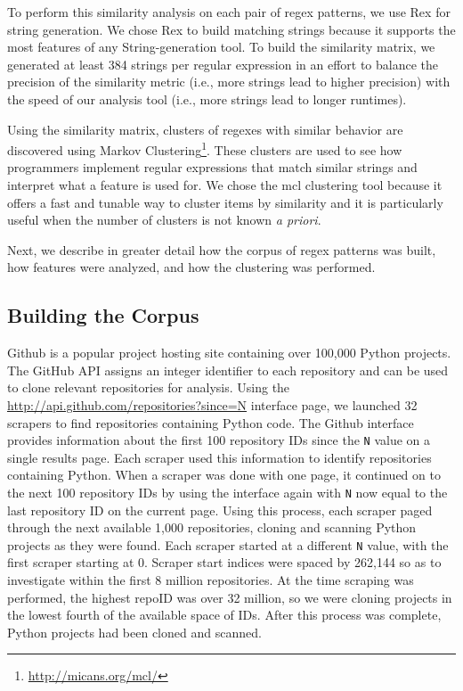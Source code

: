 To perform this similarity analysis on each pair of regex patterns, we use Rex for string generation.  We chose Rex to build matching strings because it supports the most features of any String-generation tool. To build the similarity matrix, we generated at least 384 strings per regular expression in an effort to balance the precision of the similarity metric (i.e., more strings lead to higher precision) with the speed of our analysis tool (i.e., more strings lead to longer runtimes).

Using the similarity matrix, clusters of regexes with similar behavior are discovered using Markov Clustering\footnote{\url{http://micans.org/mcl/}}.  These clusters are used to see how programmers implement regular expressions that match similar strings and interpret what a feature is used for.
 We chose the mcl clustering tool because it offers a fast and tunable way to cluster items by similarity and it is particularly useful when the number of clusters is not known \emph{a priori}.


Next, we describe in greater detail how the corpus of regex patterns was built, how features were analyzed, and how the clustering was performed.




\subsection{Building the Corpus}
\label{study:corpus}
Github is a popular project hosting site containing over 100,000 Python projects.  The GitHub API assigns an integer identifier to each repository and can be used to clone relevant repositories for analysis.  Using the \url{http://api.github.com/repositories?since=N} interface page, we launched 32 scrapers to find repositories containing Python code.  The Github interface provides information about the first 100 repository IDs since the {\tt N} value on a single results page.  Each scraper used this information to identify repositories containing Python.  When a scraper was done with one page, it continued on to the next 100 repository IDs by using the interface again with {\tt N} now equal to the last repository ID on the current page.  Using this process, each scraper paged through the next available 1,000 repositories, cloning and scanning Python projects as they were found.  Each scraper started at a different {\tt N} value, with the first scraper starting at 0.  Scraper start indices were spaced by 262,144 so as to investigate within the first 8 million repositories.  At the time scraping was performed, the highest repoID was over 32 million, so we were cloning projects in the lowest fourth of the available space of IDs.  After this process was complete,  Python projects had been cloned and scanned.

